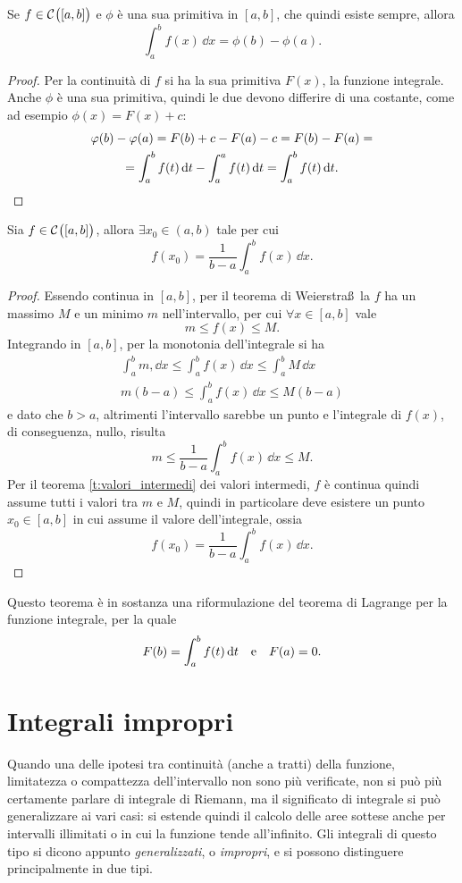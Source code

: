 \begin{teorema} \label{t:tfci2}
Se $f\in\mathcal{C}^{{}}\big([a,b]\big)$ e $\phi$ è una sua primitiva in $[a,b]$, che quindi esiste sempre, allora
\begin{equation}
\int_a^bf(x)\,\dd x=\phi(b)-\phi(a).
\end{equation}
\end{teorema}
\begin{proof}
Per la continuità di $f$ si ha la sua primitiva $F(x)$, la funzione integrale. Anche $\phi$ è una sua primitiva, quindi le due devono differire di una costante, come ad esempio $\phi(x)=F(x)+c$:
\begin{multline*}
\varphi(b)-\varphi(a)=F(b)+c-F(a)-c=F(b)-F(a)=\\
=\int_a^bf(t)\,\textup{d} t-\int_a^af(t)\,\textup{d} t=\int_a^bf(t)\,\textup{d} t.\qedhere
\end{multline*}
\end{proof}
\begin{teorema} \label{t:media-integrale}
Sia $f\in\mathcal{C}^{{}}\big([a,b]\big)$, allora $\exists x_0\in(a,b)$ tale per cui
\begin{equation}
f(x_0)=\frac1{b-a}\int_a^bf(x)\,\dd x.
\end{equation}
\end{teorema}
\begin{proof}
Essendo continua in $[a,b]$, per il teorema di Weierstra\ss\ la $f$ ha un massimo $M$ e un minimo $m$ nell'intervallo, per cui $\forall x\in[a,b]$ vale
\[
m\leq f(x)\leq M.
\]
Integrando in $[a,b]$, per la monotonia dell'integrale si ha
\begin{gather*}
\int_a^bm,\dd x\leq\int_a^bf(x)\,\dd x\leq\int_a^bM\,\dd x\\
m(b-a)\leq\int_a^bf(x)\,\dd x\leq M(b-a)
\end{gather*}
e dato che $b>a$, altrimenti l'intervallo sarebbe un punto e l'integrale di $f(x)$, di conseguenza, nullo, risulta
\[
m\leq\frac1{b-a}\int_a^bf(x)\,\dd x\leq M.
\]
Per il teorema \ref{t:valori_intermedi} dei valori intermedi, $f$ è continua quindi assume tutti i valori tra $m$ e $M$, quindi in particolare deve esistere un punto $x_0\in[a,b]$ in cui assume il valore dell'integrale, ossia
\[
f(x_0)=\frac1{b-a}\int_a^bf(x)\,\dd x.
\]
\end{proof}
Questo teorema è in sostanza una riformulazione del teorema di Lagrange per la funzione integrale, per la quale
\[
F(b)=\int_a^bf(t)\,\textup{d} t\quad\text{e}\quad F(a)=0.
\]

\section{Integrali impropri}
Quando una delle ipotesi tra continuità (anche a tratti) della funzione, limitatezza o compattezza dell'intervallo non sono più verificate, non si può più certamente parlare di integrale di Riemann, ma il significato di integrale si può generalizzare ai vari casi: si estende quindi il calcolo delle aree sottese anche per intervalli illimitati o in cui la funzione tende all'infinito. Gli integrali di questo tipo si dicono appunto \emph{generalizzati}, o \emph{impropri}, e si possono distinguere principalmente in due tipi.
